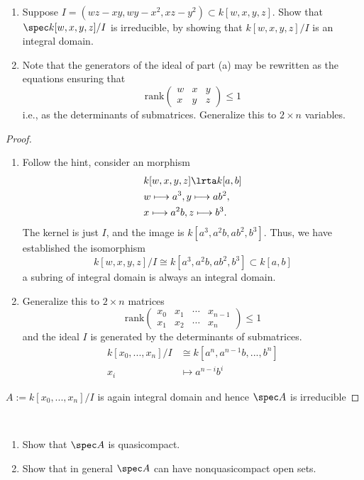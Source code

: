 \begin{exr}\ 
\begin{enumerate}[label=(\alph*)]
	\item 
Suppose $I = (wz-xy, wy-x^2 , xz-y^2 ) \subset k[w, x, y, z]$. Show that $\spec k[w, x, y, z]/I$ is irreducible, by showing that $k[w, x, y, z]/I$ is an integral domain.
\item Note that the generators of the ideal of part (a) may be rewritten as the equations ensuring that
$$
\text{rank}
\begin{pmatrix}
w & x & y\\
x & y & z
\end{pmatrix}
\leq 1
$$
i.e., as the determinants of submatrices. Generalize this to $2\times n$ variables.
\end{enumerate}
\end{exr}
\begin{proof}
\begin{enumerate}[label=(\alph*)]
	\item 
Follow the hint, consider an morphism
$$
\begin{aligned}
&k[w,x,y,z]\lrta k[a,b] \\
& w\longmapsto a^3, y\longmapsto ab^2,\\
& x\longmapsto a^2b, z\longmapsto b^3.\\
\end{aligned}
$$
The kernel is just $I$, and the image is $k[a^3,a^2b, ab^2,b^3]$. Thus, we have established the isomorphism
$$
k[w,x,y,z]/I\cong k[a^3,a^2b, ab^2,b^3]\subset k[a,b]
$$
a subring of integral domain is always an integral domain.
\item Generalize this to $2\times n$ matrices
$$
\text{rank}
\begin{pmatrix}
x_0 & x_1 & \cdots &x_{n-1}\\
x_1 & x_2 & \cdots &x_{n}
\end{pmatrix}
\leq 1
$$
and the ideal $I$ is generated by the determinants of submatrices. 
$$
\begin{aligned}
k[x_0,...,x_{n}]/I&\cong k[a^n,a^{n-1}b,...,b^{n}]\\
x_i&\longmapsto a^{n-i}b^i
\end{aligned}
$$
\end{enumerate}
$A:=k[x_0,...,x_{n}]/I$ is again integral domain and hence $\spec A$ is irreducible

\end{proof}
\begin{exr}\label{chap3exr:affine_scheme_quasicompact}\ 
\begin{enumerate}[label=(\alph*)]
\item  Show that $\spec A$ is quasicompact.
\item Show that in general $\spec A$ can have nonquasicompact open sets.
\end{enumerate}
\end{exr}
